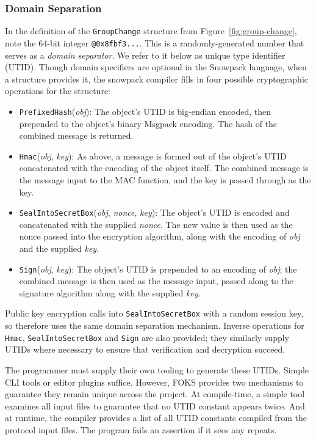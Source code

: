 \subsubsection{Domain Separation}

In the definition of the \texttt{GroupChange} structure from
Figure~\ref{fig:group-change}, note the 64-bit integer
\texttt{@0x8fbf3...}. This is a randomly-generated number that serves as
a \textit{domain separator}. We refer to it below as unique type identifier
(UTID). Though domain specifiers are optional in the Snowpack language, when a
structure provides it, the snowpack compiler fills in four possible
cryptographic operations for the structure:
%
\begin{itemize}

  \item \texttt{PrefixedHash}(\textit{obj}): The object's UTID is big-endian encoded, then
  prepended to the object's binary Msgpack encoding. The hash of the combined message is returned.

  \item \texttt{Hmac}(\textit{obj}, \textit{key}): As above, a message is formed out of the object's UTID
  concatenated with the encoding of the object itself. The combined message is the message input
  to the MAC function, and the key is passed through as the key.

  \item \texttt{SealIntoSecretBox}(\textit{obj}, \textit{nonce}, \textit{key}): The object's UTID is
  encoded and concatenated with the supplied \textit{nonce}. The new value is then used as the nonce
  passed into the encryption algorithm, along with the encoding of \textit{obj} and the supplied \textit{key}.

  \item \texttt{Sign}(\textit{obj}, \textit{key}): The object's UTID is prepended to an encoding
  of \textit{obj}; the combined message is then used as the message input, passed along to the 
  signature algorithm along with the supplied \textit{key}.

\end{itemize}
%
%
Public key encryption calls into \texttt{SealIntoSecretBox} with a random session key, so therefore uses the same
domain separation mechanism. Inverse operations for \texttt{Hmac}, \texttt{SealIntoSecretBox} and \texttt{Sign}
are also provided; they similarly supply UTIDs where necessary to ensure that verification and decryption
succeed.

The programmer must supply their own tooling to generate these UTIDs. Simple CLI tools or 
editor plugins suffice. However, FOKS provides two mechanisms to guarantee they remain unique
across the project. At compile-time, a simple tool examines all input files to guarantee that
no UTID constant appears twice. And at runtime, the compiler provides a list of all UTID constants
compiled from the protocol input files. The program fails an assertion if it sees any repeats.


